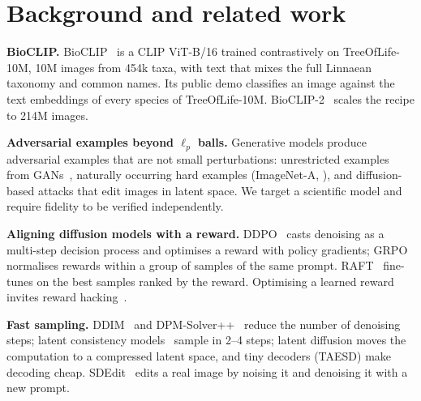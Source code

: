 \section{Background and related work}
\textbf{BioCLIP.} BioCLIP~\citep{stevens2024bioclip} is a CLIP ViT-B/16 trained contrastively on TreeOfLife-10M,
10M images from 454k taxa, with text that mixes the full Linnaean taxonomy and common names. Its public demo
classifies an image against the text embeddings of every species of TreeOfLife-10M. BioCLIP-2~\citep{gu2025bioclip2}
scales the recipe to 214M images.

\textbf{Adversarial examples beyond $\ell_p$ balls.} Generative models produce adversarial examples that are not
small perturbations: unrestricted examples from GANs~\citep{song2018constructing}, naturally occurring hard examples
(ImageNet-A, \citealp{hendrycks2021natural}), and diffusion-based attacks that edit images in latent space. We target a
scientific model and require fidelity to be verified independently.

\textbf{Aligning diffusion models with a reward.} DDPO~\citep{black2024ddpo} casts denoising as a multi-step
decision process and optimises a reward with policy gradients; GRPO~\citep{shao2024deepseekmath} normalises rewards
within a group of samples of the same prompt. RAFT~\citep{dong2023raft} fine-tunes on the best samples ranked by the
reward. Optimising a learned reward invites reward hacking~\citep{skalse2022defining}.

\textbf{Fast sampling.} DDIM~\citep{song2021ddim} and DPM-Solver++~\citep{lu2022dpmsolverpp} reduce the number of
denoising steps; latent consistency models~\citep{luo2023lcmlora} sample in 2--4 steps; latent diffusion
\citep{rombach2022ldm} moves the computation to a compressed latent space, and tiny decoders (TAESD) make decoding
cheap. SDEdit~\citep{meng2022sdedit} edits a real image by noising it and denoising it with a new prompt.
